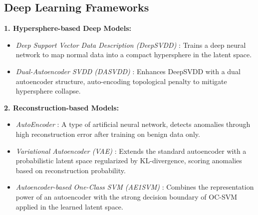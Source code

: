 \documentclass[final,twocolumn,10pt]{elsarticle}
\begin{document}
\subsection{Deep Learning Frameworks}
\textbf{1. Hypersphere-based Deep Models:}
\begin{itemize}
    \item \textit{Deep Support Vector Data Description (DeepSVDD)} \cite{DeepSVDD}: Trains a deep neural network to map normal data into a compact hypersphere in the latent space.
    \item \textit{Dual-Autoencoder SVDD (DASVDD)} \cite{DASVDD}: Enhances DeepSVDD with a dual autoencoder structure, auto-encoding topological penalty to mitigate hypersphere collapse.
\end{itemize}

\textbf{2. Reconstruction-based Models:}
\begin{itemize}
    \item \textit{AutoEncoder} \cite{Autoencoder}: A type of artificial neural network, detects anomalies through high reconstruction error after training on benign data only.     
    \item \textit{Variational Autoencoder (VAE)} \cite{VAE}: Extends the standard autoencoder with a probabilistic latent space regularized by KL-divergence, scoring anomalies based on reconstruction probability.
    \item \textit{Autoencoder-based One-Class SVM (AE1SVM)} \cite{AE1SVM}: Combines the representation power of an autoencoder with the strong decision boundary of OC-SVM applied in the learned latent space.
\end{itemize}
\end{document}
